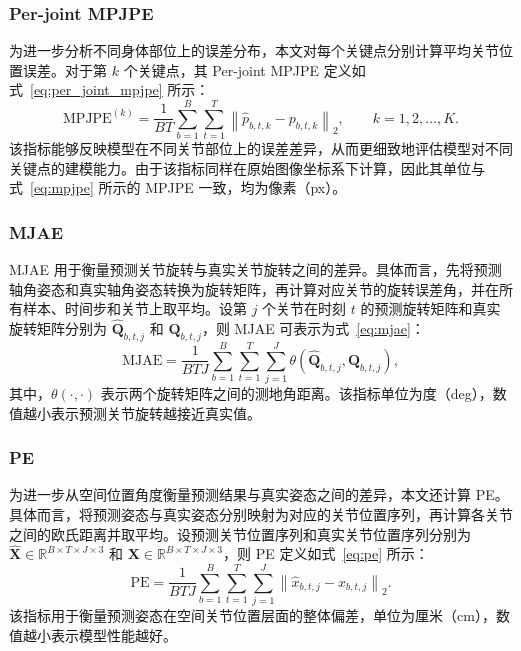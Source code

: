 \subsubsection{Per-joint MPJPE}{}

为进一步分析不同身体部位上的误差分布，本文对每个关键点分别计算平均关节位置误差。对于第 $k$ 个关键点，其 Per-joint MPJPE 定义如式~\eqref{eq:per_joint_mpjpe} 所示：
\begin{equation}
\text{MPJPE}^{(k)}=
\frac{1}{BT}
\sum_{b=1}^{B}
\sum_{t=1}^{T}
\left\|
\hat{p}_{b,t,k} - p_{b,t,k}
\right\|_2,
\qquad k=1,2,\ldots,K.
\label{eq:per_joint_mpjpe}
\end{equation}
该指标能够反映模型在不同关节部位上的误差差异，从而更细致地评估模型对不同关键点的建模能力。由于该指标同样在原始图像坐标系下计算，因此其单位与式~\eqref{eq:mpjpe} 所示的 MPJPE 一致，均为像素（px）。

\subsubsection{MJAE}{}

MJAE 用于衡量预测关节旋转与真实关节旋转之间的差异。具体而言，先将预测轴角姿态和真实轴角姿态转换为旋转矩阵，再计算对应关节的旋转误差角，并在所有样本、时间步和关节上取平均。设第 $j$ 个关节在时刻 $t$ 的预测旋转矩阵和真实旋转矩阵分别为 $\hat{\mathbf{Q}}_{b,t,j}$ 和 $\mathbf{Q}_{b,t,j}$，则 MJAE 可表示为式~\eqref{eq:mjae}：
\begin{equation}
\text{MJAE}=
\frac{1}{BTJ}
\sum_{b=1}^{B}
\sum_{t=1}^{T}
\sum_{j=1}^{J}
\theta\!\left(\hat{\mathbf{Q}}_{b,t,j},\mathbf{Q}_{b,t,j}\right),
\label{eq:mjae}
\end{equation}
其中，$\theta(\cdot,\cdot)$ 表示两个旋转矩阵之间的测地角距离。该指标单位为度（deg），数值越小表示预测关节旋转越接近真实值。

\subsubsection{PE}{}

为进一步从空间位置角度衡量预测结果与真实姿态之间的差异，本文还计算 PE。具体而言，将预测姿态与真实姿态分别映射为对应的关节位置序列，再计算各关节之间的欧氏距离并取平均。设预测关节位置序列和真实关节位置序列分别为 $\hat{\mathbf{X}} \in \mathbb{R}^{B \times T \times J \times 3}$ 和 $\mathbf{X} \in \mathbb{R}^{B \times T \times J \times 3}$，则 PE 定义如式~\eqref{eq:pe} 所示：
\begin{equation}
\text{PE}=
\frac{1}{BTJ}
\sum_{b=1}^{B}
\sum_{t=1}^{T}
\sum_{j=1}^{J}
\left\|
\hat{x}_{b,t,j}-x_{b,t,j}
\right\|_2.
\label{eq:pe}
\end{equation}
该指标用于衡量预测姿态在空间关节位置层面的整体偏差，单位为厘米（cm），数值越小表示模型性能越好。

